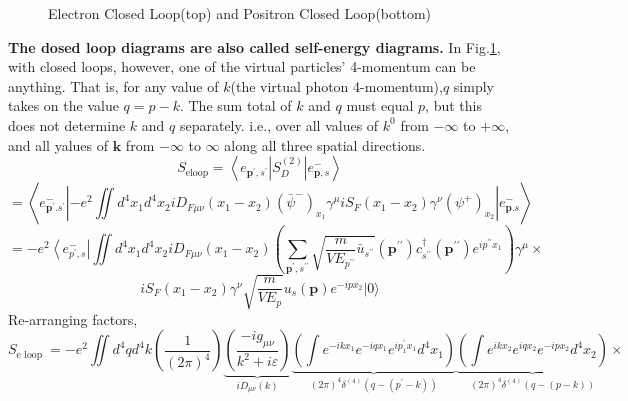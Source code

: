 \begin{figure}[H]
    \caption{Electron Closed Loop(top) and Positron Closed Loop(bottom)}
    \label{fig:electron-positron-closed-loop}
\end{figure}
\textbf{The dosed loop diagrams are also called self-energy diagrams.} In Fig.\ref{fig:electron-positron-closed-loop}, with closed loops, however, one of the virtual particles' 4-momentum can be anything. That is, for any value of $k$(the virtual photon 4-momentum),$q$ simply takes on the value $q=p-k$. The sum total of $k$ and $q$ must equal $p$, but this does not determine $k$ and $q$ separately.  i.e., over all values of $k^{0}$ from $-\infty$ to $+\infty$, and all yalues of $\mathbf{k}$ from $-\infty$ to $\infty$ along all three spatial directions.
$$
S_{\text {eloop}}=\left\langle e_{\mathbf{p}^{\prime}, s^{\prime}}\left|S_{D}^{(2)}\right|{e_{\mathbf{p}, s}^-}\right\rangle
$$
$$
=\left\langle e^-_{\mathbf{p}^{\prime} . s^{\prime}}\left|-e^{2} \iint d^{4} x_{1} d^{4} x_{2} i D_{F \mu \nu}\left(x_{1}-x_{2}\right)(\bar{\psi}^-)_{x_{1}} \gamma^{\mu} i S_{F}\left(x_{1}-x_{2}\right) \gamma^{\nu}\left(\psi^{+}\right)_{x_{2}}\right| e_{\mathbf{p} . s}^{-}\right\rangle
$$
$$
=-e^{2}\left\langle e_{p^{\prime}, s}^{-}\right| \iint d^{4} x_{1} d^{4} x_{2} i D_{F \mu \nu}\left(x_{1}-x_{2}\right)\left(\sum_{\mathbf{p}^{\prime}, s^{\prime\prime}} \sqrt{\frac{m}{V E_{p^{\prime \prime}}} \bar{u}_{s^{\prime\prime}}}\left(\mathbf{p}^{\prime \prime}\right) c_{s^{\prime\prime}}^{\dagger}\left(\mathbf{p}^{\prime\prime}\right) e^{i p^{\prime\prime} x_{1}}\right) \gamma^{\mu} \times
$$
$$
i S_{F}\left(x_{1}-x_{2}\right) \gamma^{\nu} \sqrt{\frac{m}{V E_{p}}} u_{s}(\mathbf{p}) e^{-i p x_{2}}|0\rangle
$$
Re-arranging factors, \textbf{}
$$
S_{\text {e loop }}=-e^{2} \iint d^{4} q d^{4} k\left(\frac{1}{(2 \pi)^{4}}\right) \underbrace{\left(\frac{-i g_{\mu \nu}}{k^{2}+i \varepsilon}\right)}_{i D_{\mu \nu}(k)}\underbrace{\left(\int e^{-i kx_{1}} e^{-i q x_{1}} e^{i p_{1}^{\prime}x_1} d^{4} x_{1}\right)}_{(2 \pi)^{4} \delta^{(4)}\left(q-\left(p^{\prime}-k\right)\right)}\underbrace{\left(\int e^{i k x_{2}} e^{i q x_{2}} e^{-i p x_{2}} d^{4} x_{2}\right)}_{(2 \pi)^{4} \delta^{(4)}(q-(p-k))}\times
$$
